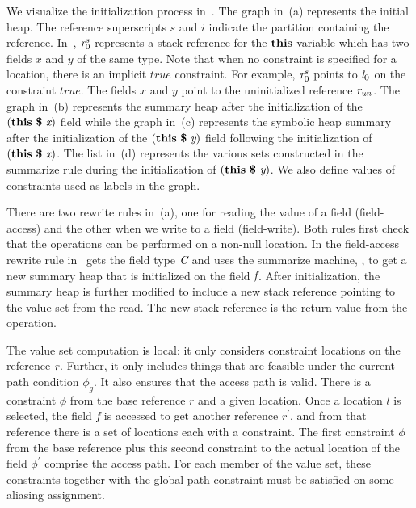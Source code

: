 We visualize the initialization process in~. The
graph in~(a) represents the initial heap. The
reference superscripts $s$ and $i$ indicate the partition containing
the reference.  In~, $\emph{r}_0^s$ represents a
stack reference for the $\textbf{this}$ variable which has two fields
$x$ and $y$ of the same type. Note that when no constraint is
specified for a location, there is an implicit $\mathit{true}$
constraint. For example, $\emph{r}_0^s$ points to $\emph{l}_0$ on
the constraint $\mathit{true}$. The fields $x$ and $y$ point to the
uninitialized reference $\emph{r}_\mathit{un}$. The graph
in~(b) represents the summary heap after the
initialization of the $\lp\cfgt{this}\ \cfgt{\$}\ \cfgnt{x}\rp$ field
while the graph in~(c) represents the symbolic
heap summary after the initialization of the
$\lp\cfgt{this}\ \cfgt{\$}\ \cfgnt{y}\rp$ field following the
initialization of $\lp\cfgt{this}\ \cfgt{\$}\ \cfgnt{x}\rp$. The list
in~(d) represents the various sets constructed in
the summarize rule during the initialization of
$\lp\cfgt{this}\ \cfgt{\$}\ \cfgnt{y}\rp$. We also define values of
constraints used as labels in the graph.




There are two rewrite rules in~(a), one for reading
the value of a field (field-access) and the other when we write to a
field (field-write). Both rules first check that the operations can be
performed on a non-null location.  In the field-access rewrite rule
in~ gets the field type $\emph{C}$ and uses the
summarize machine, , to get a new summary heap
that is initialized on the field $\emph{f}$. After initialization,
the summary heap is further modified to include a new stack reference
pointing to the value set from the read. The new stack reference is
the return value from the operation. 


  

The value set computation is local: it only considers constraint
locations on the reference $\emph{r}$. Further, it only includes
things that are feasible under the current path condition $\phi_g$. It
also ensures that the access path is valid. There is a constraint
$\phi$ from the base reference $r$ and a given location. Once a
location $l$ is selected, the field $\emph{f}$ is accessed to get
another reference $r^\prime$, and from that reference there is a set
of locations each with a constraint. The first constraint $\phi$ from
the base reference plus this second constraint to the actual location
of the field $\phi^\prime$ comprise the access path. For each member
of the value set, these constraints together with the global path
constraint must be satisfied on some aliasing assignment.


